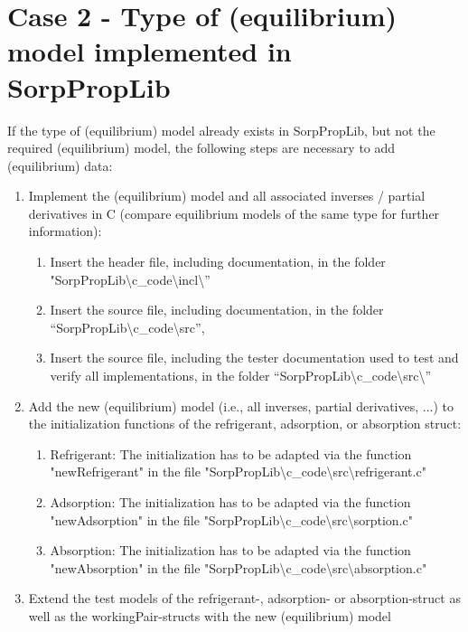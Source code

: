 \section{Case 2 - Type of (equilibrium) model implemented in SorpPropLib}
\label{cha:extensions:case2}
%
If the type of (equilibrium) model already exists in SorpPropLib, but not the required (equilibrium) model, the following steps are necessary to add (equilibrium) data:
\begin{enumerate}
	\item Implement the (equilibrium) model and all associated inverses / partial derivatives in C (compare equilibrium models of the same type for further information):
	\begin{enumerate}
		\item Insert the header file, including documentation, in the folder "SorpPropLib\textbackslash c\_code\textbackslash incl\textbackslash ”
		\item Insert the source file, including documentation, in the folder “SorpPropLib\textbackslash c\_code\textbackslash src”,
		\item Insert the source file, including the tester documentation used to test and verify all implementations, in the folder “SorpPropLib\textbackslash c\_code\textbackslash src\textbackslash ”
	\end{enumerate}
	\item Add the new (equilibrium) model (i.e., all inverses, partial derivatives, ...) to the initialization functions of the refrigerant, adsorption, or absorption struct:
	\begin{enumerate}
		\item Refrigerant: The initialization has to be adapted via the function "newRefrigerant" in the file "SorpPropLib\textbackslash c\_code\textbackslash src\textbackslash refrigerant.c"
		\item Adsorption: The initialization has to be adapted via the function "newAdsorption" in the file "SorpPropLib\textbackslash c\_code\textbackslash src\textbackslash sorption.c"
		\item Absorption: The initialization has to be adapted via the function "newAbsorption" in the file "SorpPropLib\textbackslash c\_code\textbackslash src\textbackslash absorption.c"
	\end{enumerate}
	\item Extend the test models of the refrigerant-, adsorption- or absorption-struct as well as the workingPair-structs with the new (equilibrium) model
	\begin{enumerate}

\end{enumerate}
\end{enumerate}

